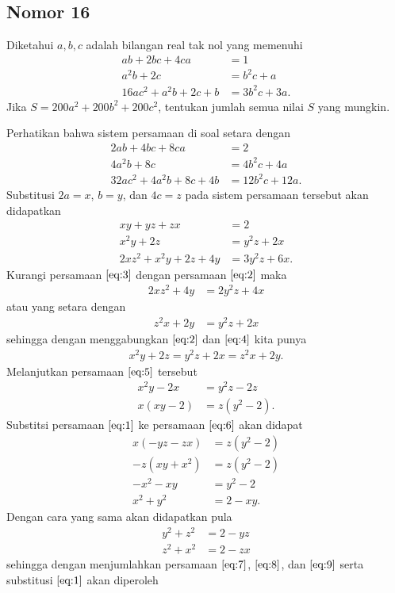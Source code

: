 \documentclass[12pt]{scrartcl}
\begin{document}
\newpage
\subsection{Nomor 16}
Diketahui $a,b,c$ adalah bilangan real tak nol yang memenuhi 
\begin{align*}
    ab+2bc+4ca&=1\\
    a^2b+2c&=b^2c+a\\
    16ac^2+a^2b+2c+b &= 3b^2c+3a.
\end{align*}
Jika $S=200a^2+200b^2+200c^2$, tentukan jumlah semua nilai $S$ yang mungkin.

\begin{jawaban} Perhatikan bahwa sistem persamaan di soal setara dengan
\begin{align*}
    2ab+4bc+8ca&=2\\
    4a^2b+8c&=4b^2c+4a\\
    32ac^2+4a^2b+8c+4b &= 12b^2c+12a.
\end{align*}
Substitusi $2a=x$, $b=y$, dan $4c=z$ pada sistem persamaan tersebut akan didapatkan
\begin{align}
    xy+yz+zx &= 2\label{eq:1}\\
    x^2y+2z &= y^2 z+2x\label{eq:2}\\
    2xz^2+x^2y+2z+4y &= 3y^2z + 6x.\label{eq:3}
\end{align}
Kurangi persamaan $\eqref{eq:3}$ dengan persamaan $\eqref{eq:2}$ maka
\begin{align*}
    2xz^2+4y &= 2y^2z + 4x
\end{align*}
atau yang setara dengan
\begin{align}
    z^2x+2y &= y^2z + 2x\label{eq:4}
\end{align}
sehingga dengan menggabungkan $\eqref{eq:2}$ dan $\eqref{eq:4}$ kita punya
\begin{align}
    x^2y+2z = y^2z + 2x =z^2x+2y.\label{eq:5}
\end{align}
Melanjutkan persamaan $\eqref{eq:5}$ tersebut
\begin{align}
    x^2y-2x &= y^2z-2z \nonumber \\
    x(xy-2) &= z(y^2-2).\label{eq:6}
\end{align}
Substitsi persamaan $\eqref{eq:1}$ ke persamaan $\eqref{eq:6}$ akan didapat 
\begin{align}
    x(-yz-zx) &= z(y^2-2)\nonumber\\
    -z(xy+x^2) &= z(y^2-2)\nonumber\\
    -x^2-xy &= y^2-2\nonumber\\
    x^2+y^2 &= 2-xy. \label{eq:7}
\end{align}
Dengan cara yang sama akan didapatkan pula
\begin{align}
    y^2+z^2 &= 2-yz \label{eq:8}\\
    z^2+x^2 &= 2-zx \label{eq:9}
\end{align}
sehingga dengan menjumlahkan persamaan $\eqref{eq:7}$, $\eqref{eq:8}$, dan $\eqref{eq:9}$ serta substitusi $\eqref{eq:1}$ akan diperoleh


\end{jawaban}
\end{document}
